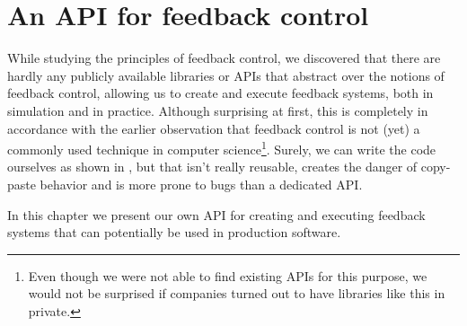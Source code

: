 \chapter{An API for feedback control}
\label{chap:feedback-api}
While studying the principles of feedback control, we discovered that there are hardly any publicly available libraries or APIs that abstract over the notions of feedback control, allowing us to create and execute feedback systems, both in simulation and in practice. Although surprising at first, this is completely in accordance with the earlier observation that feedback control is not (yet) a commonly used technique in computer science\footnote{Even though we were not able to find existing APIs for this purpose, we would not be surprised if companies turned out to have libraries like this in private.}. Surely, we can write the code ourselves as shown in , but that isn't really reusable, creates the danger of copy-paste behavior and is more prone to bugs than a dedicated API.

In this chapter we present our own API for creating and executing feedback systems that can potentially be used in production software. 







































































